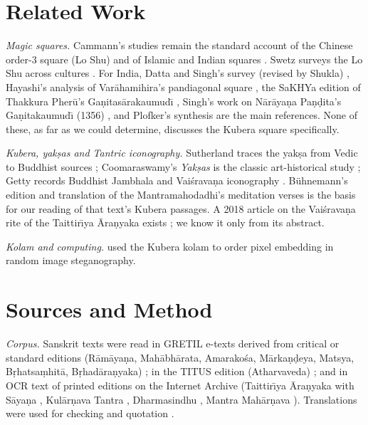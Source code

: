 \documentclass[pdflatex,sn-basic]{sn-jnl}
\theoremstyle{thmstyleone}
\theoremstyle{thmstylethree}
\begin{document}
\section{Related Work}
\label{sec:related}
\emph{Magic squares.} Cammann's studies remain the standard account of the Chinese order-3 square (Lo Shu) and of Islamic and Indian squares \citep{cammann1960,cammann1961,cammann1969a,cammann1969b}. Swetz surveys the Lo Shu across cultures \citep{swetz2008}. For India, Datta and Singh's survey (revised by Shukla) \citep{datta1992}, Hayashi's analysis of Var\=ahamihira's pandiagonal square \citep{hayashi1987}, the SaKHYa edition of Thakkura Pher\=u's Ga\d nitas\=arakaumud\=\i{} \citep{sakhya2009}, Singh's work on N\=ar\=aya\d na Pa\d n\d dita's Ga\d nitakaumud\=\i{} (1356) \citep{singh1998}, and Plofker's synthesis \citep{plofker2009} are the main references. None of these, as far as we could determine, discusses the Kubera square specifically.

\emph{Kubera, yak\d sas and Tantric iconography.} Sutherland traces the yak\d sa from Vedic to Buddhist sources \citep{sutherland1991}; Coomaraswamy's \emph{Yak\d sas} is the classic art-historical study \citep{coomaraswamy1928}; Getty records Buddhist Jambhala and Vai\'srava\d na iconography \citep{getty1914}. B\"uhnemann's edition and translation of the Mantramahodadhi's meditation verses \citep{buhnemann2000} is the basis for our reading of that text's Kubera passages. A 2018 article on the Vai\'srava\d na rite of the Taittir\=\i ya \=Ara\d nyaka exists \citep{joi2018vaisravana}; we know it only from its abstract.

\emph{Kolam and computing.} \citet{amirtharajan2013} used the Kubera kolam to order pixel embedding in random image steganography.

\section{Sources and Method}
\label{sec:method}
\emph{Corpus.} Sanskrit texts were read in GRETIL e-texts derived from critical or standard editions (R\=am\=aya\d na, Mah\=abh\=arata, Amarako\'sa, M\=arka\d n\d deya, Matsya, B\d rhatsa\d mhit\=a, B\d rhad\=ara\d nyaka) \citep{gretil_ramayana,gretil_mbh12,gretil_amara,gretil_mkp,gretil_matsya,gretil_bs,gretil_bau}; in the TITUS edition (Atharvaveda) \citep{titus_avs}; and in OCR text of printed editions on the Internet Archive (Taittir\=\i ya \=Ara\d nyaka with S\=aya\d na \citep{mitra1872ta}, Kul\=ar\d nava Tantra \citep{kularnava1917}, Dharmasindhu \citep{dharmasindhu1907}, Mantra Mah\=ar\d nava \citep{mantramaharnava}). Translations were used for checking and quotation \citep{roy_santi2,dutt1896mkp,mm1988trans,buhnemann2000,eggeling1900sbe44,agrippa1651}.
\end{document}
